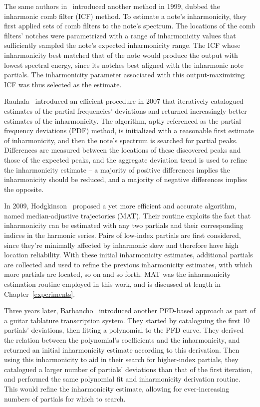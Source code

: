 \documentclass[12pt]{cmuthesis}
\begin{document}
 The same authors in~\cite{galembo1999} introduced another method in 1999, dubbed the inharmonic comb filter (ICF) method. To estimate a note's inharmonicity, they first applied sets of comb filters to the note's spectrum. The locations of the comb filters' notches were parametrized with a range of inharmonicity values that sufficiently sampled the note's expected inharmonicity range. The ICF whose inharmonicity best matched that of the note would produce the output with lowest spectral energy, since its notches best aligned with the inharmonic note partials. The inharmonicity parameter associated with this output-maximizing ICF was thus selected as the estimate.
 
Rauhala~\cite{rauhala2007} introduced an efficient procedure in 2007 that iteratively catalogued estimates of the partial frequencies' deviations and returned increasingly better estimates of the inharmonicity. The algorithm, aptly referenced as the partial frequency deviations (PDF) method, is initialized with a reasonable first estimate of inharmonicity, and then the note's spectrum is searched for partial peaks. Differences are measured between the locations of these discovered peaks and those of the expected peaks, and the aggregate deviation trend is used to refine the inharmonicity estimate -- a majority of positive differences implies the inharmonicity should be reduced, and a majority of negative differences implies the opposite.

In 2009, Hodgkinson~\cite{hodgkinson2009} proposed a yet more efficient and accurate algorithm, named median-adjustive trajectories (MAT). Their routine exploits the fact that inharmonicity can be estimated with any two partials and their corresponding indices in the harmonic series. Pairs of low-index partials are first considered, since they're minimally affected by inharmonic skew and therefore have high location reliability. With these initial inharmonicity estimates, additional partials are collected and used to refine the previous inharmonicity estimates, with which more partials are located, so on and so forth. MAT was the inharmonicity estimation routine employed in this work, and is discussed at length in Chapter~\ref{experiments}.

Three years later, Barbancho~\cite{barbanchoi2012} introduced another PFD-based approach as part of a guitar tablature transcription system. They started by cataloguing the first 10 partials' deviations, then fitting a polynomial to the PFD curve. They derived the relation between the polynomial's coefficients and the inharmonicity, and returned an initial inharmonicity estimate according to this derivation. Then using this inharmonicity to aid in their search for higher-index partials, they catalogued a larger number of partials' deviations than that of the first iteration, and performed the same polynomial fit and inharmonicity derivation routine. This would refine the inharmonicity estimate, allowing for ever-increasing numbers of partials for which to search.
\end{document}
